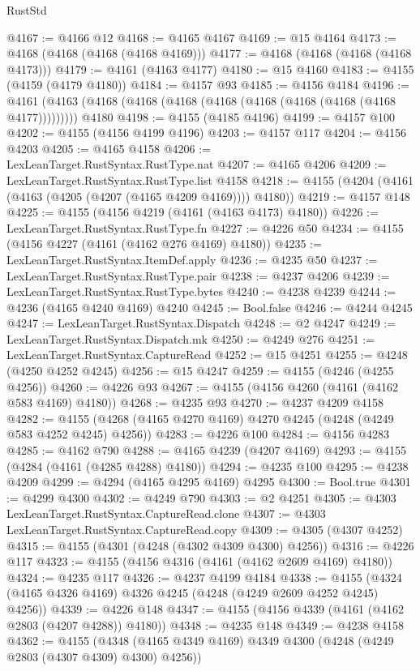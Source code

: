 \begin{lexlean}{RustStd}
\begin{coremodule}
@4167 := @4166 @12
@4168 := @4165 @4167
@4169 := @15 @4164
@4173 := @4168 (@4168 (@4168 (@4168 @4169)))
@4177 := @4168 (@4168 (@4168 (@4168 @4173)))
@4179 := @4161 (@4163 @4177)
@4180 := @15 @4160
@4183 := @4155 (@4159 (@4179 @4180))
@4184 := @4157 @93
@4185 := @4156 @4184
@4196 := @4161 (@4163 (@4168 (@4168 (@4168 (@4168 (@4168 (@4168 (@4168 (@4168 @4177))))))))) @4180
@4198 := @4155 (@4185 @4196)
@4199 := @4157 @100
@4202 := @4155 (@4156 @4199 @4196)
@4203 := @4157 @117
@4204 := @4156 @4203
@4205 := @4165 @4158
@4206 := LexLeanTarget.RustSyntax.RustType.nat
@4207 := @4165 @4206
@4209 := LexLeanTarget.RustSyntax.RustType.list @4158
@4218 := @4155 (@4204 (@4161 (@4163 (@4205 (@4207 (@4165 @4209 @4169)))) @4180))
@4219 := @4157 @148
@4225 := @4155 (@4156 @4219 (@4161 (@4163 @4173) @4180))
@4226 := LexLeanTarget.RustSyntax.RustType.fn
@4227 := @4226 @50
@4234 := @4155 (@4156 @4227 (@4161 (@4162 @276 @4169) @4180))
@4235 := LexLeanTarget.RustSyntax.ItemDef.apply
@4236 := @4235 @50
@4237 := LexLeanTarget.RustSyntax.RustType.pair
@4238 := @4237 @4206
@4239 := LexLeanTarget.RustSyntax.RustType.bytes
@4240 := @4238 @4239
@4244 := @4236 (@4165 @4240 @4169) @4240
@4245 := Bool.false
@4246 := @4244 @4245
@4247 := LexLeanTarget.RustSyntax.Dispatch
@4248 := @2 @4247
@4249 := LexLeanTarget.RustSyntax.Dispatch.mk
@4250 := @4249 @276
@4251 := LexLeanTarget.RustSyntax.CaptureRead
@4252 := @15 @4251
@4255 := @4248 (@4250 @4252 @4245)
@4256 := @15 @4247
@4259 := @4155 (@4246 (@4255 @4256))
@4260 := @4226 @93
@4267 := @4155 (@4156 @4260 (@4161 (@4162 @583 @4169) @4180))
@4268 := @4235 @93
@4270 := @4237 @4209 @4158
@4282 := @4155 (@4268 (@4165 @4270 @4169) @4270 @4245 (@4248 (@4249 @583 @4252 @4245) @4256))
@4283 := @4226 @100
@4284 := @4156 @4283
@4285 := @4162 @790
@4288 := @4165 @4239 (@4207 @4169)
@4293 := @4155 (@4284 (@4161 (@4285 @4288) @4180))
@4294 := @4235 @100
@4295 := @4238 @4209
@4299 := @4294 (@4165 @4295 @4169) @4295
@4300 := Bool.true
@4301 := @4299 @4300
@4302 := @4249 @790
@4303 := @2 @4251
@4305 := @4303 LexLeanTarget.RustSyntax.CaptureRead.clone
@4307 := @4303 LexLeanTarget.RustSyntax.CaptureRead.copy
@4309 := @4305 (@4307 @4252)
@4315 := @4155 (@4301 (@4248 (@4302 @4309 @4300) @4256))
@4316 := @4226 @117
@4323 := @4155 (@4156 @4316 (@4161 (@4162 @2609 @4169) @4180))
@4324 := @4235 @117
@4326 := @4237 @4199 @4184
@4338 := @4155 (@4324 (@4165 @4326 @4169) @4326 @4245 (@4248 (@4249 @2609 @4252 @4245) @4256))
@4339 := @4226 @148
@4347 := @4155 (@4156 @4339 (@4161 (@4162 @2803 (@4207 @4288)) @4180))
@4348 := @4235 @148
@4349 := @4238 @4158
@4362 := @4155
    (@4348 (@4165 @4349 @4169) @4349 @4300 (@4248 (@4249 @2803 (@4307 @4309) @4300) @4256))

\end{coremodule}
\end{lexlean}
